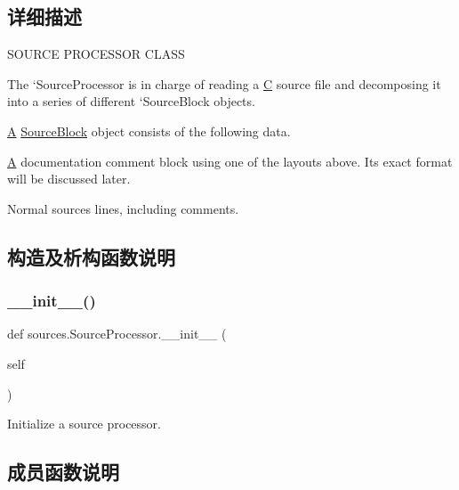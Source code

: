 \subsection{详细描述}
S\+O\+U\+R\+CE P\+R\+O\+C\+E\+S\+S\+OR C\+L\+A\+SS 

The `\+Source\+Processor\textquotesingle{} is in charge of reading a \hyperlink{struct_c}{C} source file and decomposing it into a series of different `\+Source\+Block\textquotesingle{} objects.

\hyperlink{struct_a}{A} \hyperlink{classsources_1_1_source_block}{Source\+Block} object consists of the following data.


\begin{DoxyItemize}
\item \hyperlink{struct_a}{A} documentation comment block using one of the layouts above. Its exact format will be discussed later.
\item Normal sources lines, including comments. 
\end{DoxyItemize}

\subsection{构造及析构函数说明}
\mbox{\label{classsources_1_1_source_processor_a976a915b122b4e1eaae02ff140c04292}} 
\subsubsection{\texorpdfstring{\+\_\+\+\_\+init\+\_\+\+\_\+()}{\_\_init\_\_()}}
{\footnotesize\ttfamily def sources.\+Source\+Processor.\+\_\+\+\_\+init\+\_\+\+\_\+ (\begin{DoxyParamCaption}\item[{}]{self }\end{DoxyParamCaption})}

\begin{DoxyVerb}Initialize a source processor.\end{DoxyVerb}
 

\subsection{成员函数说明}
\mbox{\label{classsources_1_1_source_processor_a461735ab30867f32d3e974ee8f2c255d}} 
